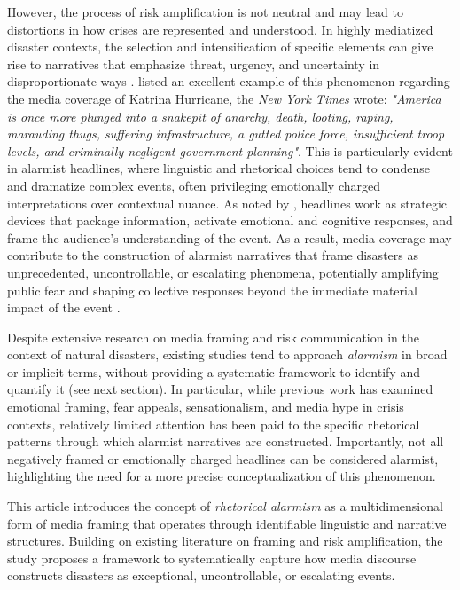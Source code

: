 However, the process of risk amplification is not neutral and may lead to distortions in how crises are represented and understood. 
In highly mediatized disaster contexts, the selection and intensification of specific elements
can give rise to narratives that emphasize threat, urgency, and uncertainty in disproportionate ways \parencite{mediatized_disasters}.
\textcite{Holm_disaster} listed an excellent example of this phenomenon regarding the media coverage of Katrina Hurricane,
the \emph{New York Times} wrote: \emph{"America is once more plunged into a snakepit of anarchy, death, looting,
raping, marauding thugs, suffering infrastructure, a gutted police force,
insufficient troop levels, and criminally negligent government planning"}. This is particularly evident in alarmist headlines, where linguistic and rhetorical 
choices tend to condense and dramatize complex events, often privileging emotionally charged interpretations over contextual nuance. As noted by \textcite{pragma_linguistic}, headlines work as strategic devices that package information, activate emotional and cognitive
responses, and frame the audience's understanding of the event. As a result, media coverage 
may contribute to the construction of alarmist narratives that frame disasters 
as unprecedented, uncontrollable, or escalating phenomena, potentially amplifying public fear and 
shaping collective responses beyond the immediate material impact of the event \parencite{fear_news,creating_fear}.

Despite extensive research on media framing and risk communication in the context 
of natural disasters, existing studies tend to approach \emph{alarmism} in broad 
or implicit terms, without providing a systematic framework to identify and quantify
it (see next section). In particular, while previous work has examined emotional 
framing, fear appeals, sensationalism, and media hype in crisis contexts, 
relatively limited attention has been paid to the specific rhetorical 
patterns through which alarmist narratives are constructed. Importantly, 
not all negatively framed or emotionally charged headlines 
can be considered alarmist, highlighting the need for a more 
precise conceptualization of this phenomenon.

This article introduces the concept of 
\emph{rhetorical alarmism} as a multidimensional form of media framing that 
operates through identifiable linguistic and narrative structures.
Building on existing literature on framing and risk amplification,
the study proposes a framework to systematically capture how media 
discourse constructs disasters as exceptional, uncontrollable, 
or escalating events. 

